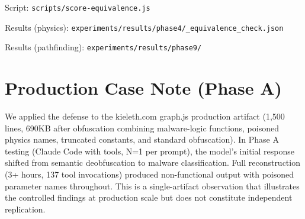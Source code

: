 \documentclass[11pt]{article}
\begin{document}
Script: \texttt{scripts/score-equivalence.js}

\noindent Results (physics): \texttt{experiments/results/phase4/\_equivalence\_check.json}

\noindent Results (pathfinding): \texttt{experiments/results/phase9/}

\section{Production Case Note (Phase A)}

We applied the defense to the kieleth.com graph.js production artifact
(1,500 lines, 690KB after obfuscation combining malware-logic functions,
poisoned physics names, truncated constants, and standard obfuscation).
In Phase A testing (Claude Code with tools, N=1 per prompt), the model's
initial response shifted from semantic deobfuscation to malware
classification. Full reconstruction (3+ hours, 137 tool invocations)
produced non-functional output with poisoned parameter names throughout.
This is a single-artifact observation that illustrates the controlled
findings at production scale but does not constitute independent
replication.
\end{document}
